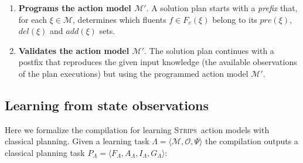 \documentclass[3p,times]{elsarticle}
\newcommand{\strips}{\textsc{Strips}}     %
\newcommand{\tup}[1]{{\langle #1 \rangle}}
\begin{document}
\begin{enumerate}
\item {\bf Programs the action model $\mathcal{M}'$}. A solution plan starts with a {\em prefix} that, for each $\xi\in\mathcal{M}$, determines which fluents $f\in F_v(\xi)$ belong to its $pre(\xi)$, $del(\xi)$ and $add(\xi)$ sets.
\item {\bf Validates the action model $\mathcal{M}'$}. The solution plan continues with a postfix that reproduces the given input knowledge (the available observations of the plan executions) but using the programmed action model $\mathcal{M}'$.
\end{enumerate}


\subsection{Learning from state observations}
Here we formalize the compilation for learning \strips\ action models with classical planning. Given a learning task $\Lambda=\tup{\mathcal{M},\mathcal{O},\Psi}$ the compilation outputs a classical planning task $P_{\Lambda}=\tup{F_{\Lambda},A_{\Lambda},I_{\Lambda},G_{\Lambda}}$:
\end{document}
